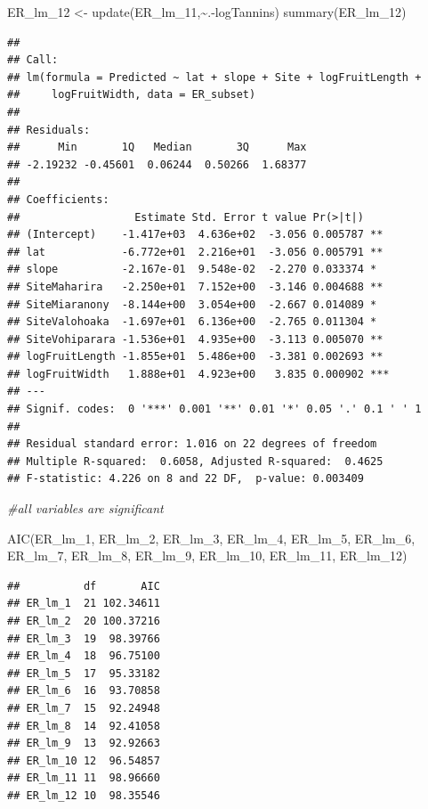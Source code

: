 \documentclass[
  12pt,
]{article}
\newenvironment{Shaded}{\begin{snugshade}}{\end{snugshade}}
\newcommand{\CommentTok}[1]{\textcolor[rgb]{0.56,0.35,0.01}{\textit{#1}}}
\newcommand{\FunctionTok}[1]{\textcolor[rgb]{0.00,0.00,0.00}{#1}}
\newcommand{\NormalTok}[1]{#1}
\newcommand{\OtherTok}[1]{\textcolor[rgb]{0.56,0.35,0.01}{#1}}
\newcommand{\SpecialCharTok}[1]{\textcolor[rgb]{0.00,0.00,0.00}{#1}}
\begin{document}
\begin{Shaded}
\begin{Highlighting}[]
\NormalTok{ER\_lm\_12 }\OtherTok{\textless{}{-}} \FunctionTok{update}\NormalTok{(ER\_lm\_11,}\SpecialCharTok{\textasciitilde{}}\NormalTok{.}\SpecialCharTok{{-}}\NormalTok{logTannins)}
\FunctionTok{summary}\NormalTok{(ER\_lm\_12)}
\end{Highlighting}
\end{Shaded}

\begin{verbatim}
## 
## Call:
## lm(formula = Predicted ~ lat + slope + Site + logFruitLength + 
##     logFruitWidth, data = ER_subset)
## 
## Residuals:
##      Min       1Q   Median       3Q      Max 
## -2.19232 -0.45601  0.06244  0.50266  1.68377 
## 
## Coefficients:
##                  Estimate Std. Error t value Pr(>|t|)    
## (Intercept)    -1.417e+03  4.636e+02  -3.056 0.005787 ** 
## lat            -6.772e+01  2.216e+01  -3.056 0.005791 ** 
## slope          -2.167e-01  9.548e-02  -2.270 0.033374 *  
## SiteMaharira   -2.250e+01  7.152e+00  -3.146 0.004688 ** 
## SiteMiaranony  -8.144e+00  3.054e+00  -2.667 0.014089 *  
## SiteValohoaka  -1.697e+01  6.136e+00  -2.765 0.011304 *  
## SiteVohiparara -1.536e+01  4.935e+00  -3.113 0.005070 ** 
## logFruitLength -1.855e+01  5.486e+00  -3.381 0.002693 ** 
## logFruitWidth   1.888e+01  4.923e+00   3.835 0.000902 ***
## ---
## Signif. codes:  0 '***' 0.001 '**' 0.01 '*' 0.05 '.' 0.1 ' ' 1
## 
## Residual standard error: 1.016 on 22 degrees of freedom
## Multiple R-squared:  0.6058, Adjusted R-squared:  0.4625 
## F-statistic: 4.226 on 8 and 22 DF,  p-value: 0.003409
\end{verbatim}

\begin{Shaded}
\begin{Highlighting}[]
\CommentTok{\#all variables are significant}

\FunctionTok{AIC}\NormalTok{(ER\_lm\_1, ER\_lm\_2, ER\_lm\_3, ER\_lm\_4, ER\_lm\_5, ER\_lm\_6, ER\_lm\_7, ER\_lm\_8, ER\_lm\_9, ER\_lm\_10, ER\_lm\_11, ER\_lm\_12)}
\end{Highlighting}
\end{Shaded}

\begin{verbatim}
##          df       AIC
## ER_lm_1  21 102.34611
## ER_lm_2  20 100.37216
## ER_lm_3  19  98.39766
## ER_lm_4  18  96.75100
## ER_lm_5  17  95.33182
## ER_lm_6  16  93.70858
## ER_lm_7  15  92.24948
## ER_lm_8  14  92.41058
## ER_lm_9  13  92.92663
## ER_lm_10 12  96.54857
## ER_lm_11 11  98.96660
## ER_lm_12 10  98.35546
\end{verbatim}
\end{document}
